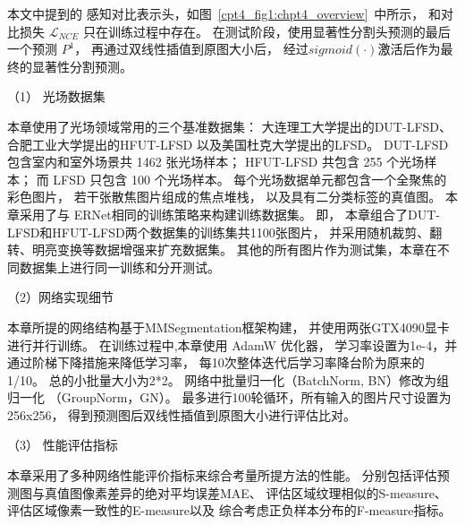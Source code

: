 


本文中提到的
感知对比表示头，如图~\ref{cpt4_fig1:chpt4_overview}~中所示，
和对比损失 $\mathcal{L}_{NCE}$
只在训练过程中存在。
在测试阶段，使用显著性分割头预测的最后一个预测 $P^{1}$， 再通过双线性插值到原图大小后，
经过$sigmoid(\cdot)$激活后作为最终的显著性分割预测。







（1）
光场数据集


本章使用了光场领域常用的三个基准数据集：
大连理工大学提出的DUT-LFSD、
合肥工业大学提出的HFUT-LFSD
以及美国杜克大学提出的LFSD。
DUT-LFSD 包含室内和室外场景共 1462 张光场样本；
HFUT-LFSD 共包含 255 个光场样本；
而 LFSD 只包含 100 个光场样本。
每个光场数据单元都包含一个全聚焦的彩色图片，
若干张散焦图片组成的焦点堆栈，
以及具有二分类标签的真值图。
本章采用了与 ERNet相同的训练策略来构建训练数据集。
即，
本章组合了DUT-LFSD和HFUT-LFSD两个数据集的训练集共1100张图片，
并采用随机裁剪、翻转、明亮变换等数据增强来扩充数据集。
其他的所有图片作为测试集，本章在不同数据集上进行同一训练和分开测试。



（2）网络实现细节


本章所提的网络结构基于MMSegmentation框架构建，
并使用两张GTX4090显卡进行并行训练。
在训练过程中,本章使用 AdamW 优化器，
学习率设置为1e-4，并通过阶梯下降措施来降低学习率，
每10次整体迭代后学习率降台阶为原来的1/10。
总的小批量大小为2*2。
网络中批量归一化（BatchNorm, BN）修改为组
归一化 （GroupNorm，GN）。
最多进行100轮循环，所有输入的图片尺寸设置为 256x256，
得到预测图后双线性插值到原图大小进行评估比对。



（3）
性能评估指标


本章采用了多种网络性能评价指标来综合考量所提方法的性能。
分别包括评估预测图与真值图像素差异的绝对平均误差MAE、
评估区域纹理相似的S-measure、
评估区域像素一致性的E-measure以及
综合考虑正负样本分布的F-measure指标。






